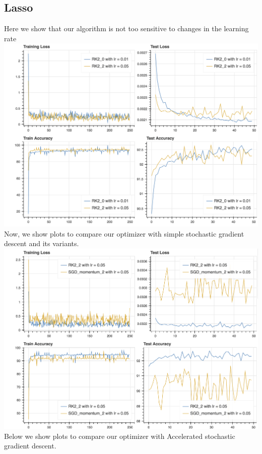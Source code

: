 \subsection*{Lasso}
Here we show that our algorithm is not too sensitive to
changes in the learning rate
\\
\includegraphics[scale=0.4]{lasso_4.png}
\\
Now, we show plots to compare our optimizer with simple
stochastic gradient descent and its variants.
\\
\includegraphics[scale=0.4]{lasso_3.png}
\\
Below we show plots to compare our optimizer with Accelerated
stochastic gradient descent.
